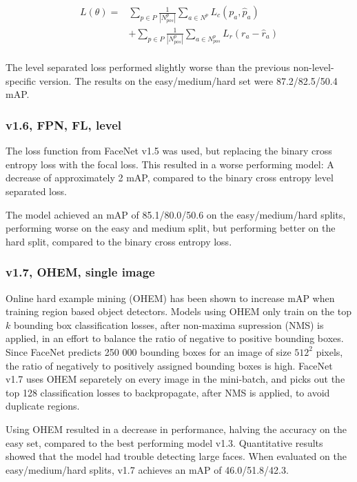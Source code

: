 \documentclass[a4paper, twoside]{article}
\begin{document}
\begin{equation}
\begin{split}
	L(\theta) = & \sum_{p \in P} \frac{1}{|N^p_{pos}|} \sum_{a \in N^p} L_c(p_a, \hat{p}_a) \\
	 & + \sum_{p \in P}  \frac{1}{|N^p_{pos}|} \sum_{a \in N^p_{pos}} L_r(r_a - \hat{r}_a)  \\ 
\end{split}
\end{equation}

The level separated loss performed slightly worse than the previous non-level-specific version. The results on the easy/medium/hard set were 87.2/82.5/50.4 mAP.

\subsubsection{v1.6, FPN, FL, level}
The loss function from FaceNet v1.5 was used, but replacing the binary cross entropy loss with the focal loss. This resulted in a worse performing model: A decrease of approximately 2 mAP, compared to the binary cross entropy level separated loss. 

The model achieved an mAP of 85.1/80.0/50.6 on the easy/medium/hard splits, performing worse on the easy and medium split, but performing better on the hard split, compared to the binary cross entropy loss.

\subsubsection{v1.7, OHEM, single image}
Online hard example mining (OHEM) \cite{ohem} has been shown to increase mAP when training region based object detectors. Models using OHEM only train on the top $k$ bounding box classification losses, after non-maxima supression (NMS) is applied, in an effort to balance the ratio of negative to positive bounding boxes. Since FaceNet predicts 250 000 bounding boxes for an image of size $512^2$ pixels, the ratio of negatively to positively assigned bounding boxes is high. FaceNet v1.7 uses OHEM separetely on every image in the mini-batch, and picks out the top 128 classification losses to backpropagate, after NMS is applied, to avoid duplicate regions.

Using OHEM resulted in a decrease in performance, halving the accuracy on the easy set, compared to the best performing model v1.3. Quantitative results showed that the model had trouble detecting large faces. When evaluated on the easy/medium/hard splits, v1.7 achieves an mAP of 46.0/51.8/42.3.
\end{document}
